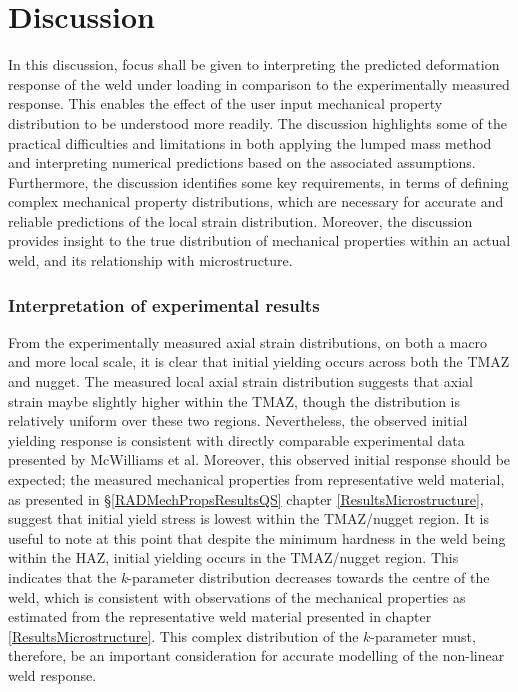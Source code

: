 \section{Discussion}
\label{Discussion}
In this discussion, focus shall be given to interpreting the predicted deformation response of the weld under loading in comparison to the experimentally measured response. This enables the effect of the user input mechanical property distribution to be understood more readily. The discussion highlights some of the practical difficulties and limitations in both applying the lumped mass method and interpreting numerical predictions based on the associated assumptions. Furthermore, the discussion identifies some key requirements, in terms of defining complex mechanical property distributions, which are necessary for accurate and reliable predictions of the local strain distribution. Moreover, the discussion provides insight to the true distribution of mechanical properties within an actual weld, and its relationship with microstructure.

\subsubsection{Interpretation of experimental results}
\label{SMDModellingstudyDiscussionReality}
From the experimentally measured axial strain distributions, on both a macro and more local scale, it is clear that initial yielding occurs across both the TMAZ and nugget. The measured local axial strain distribution suggests that axial strain maybe slightly higher within the TMAZ, though the distribution is relatively uniform over these two regions. Nevertheless, the observed initial yielding response is consistent with directly comparable experimental data presented by McWilliams et al. \cite{McWilliams2013} Moreover, this observed initial response should be expected; the measured mechanical properties from representative weld material, as presented in \S\ref{RADMechPropsResultsQS} chapter \ref{ResultsMicrostructure}, suggest that initial yield stress is lowest within the TMAZ/nugget region. It is useful to note at this point that despite the minimum hardness in the weld being within the HAZ, initial yielding occurs in the TMAZ/nugget region. This indicates that the \textit{k}-parameter distribution decreases towards the centre of the weld, which is consistent with observations of the mechanical properties as estimated from the representative weld material presented in chapter \ref{ResultsMicrostructure}. This complex distribution of the $k$-parameter must, therefore, be an important consideration for accurate modelling of the non-linear weld response.  


